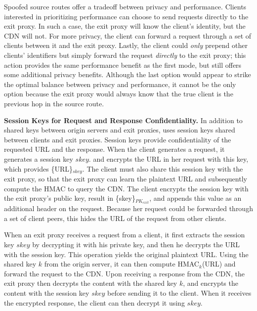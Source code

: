 Spoofed source routes offer a tradeoff between privacy and performance. Clients interested in prioritizing performance can choose to send requests directly to the exit proxy. In such a case, the exit proxy will know the client's identity, but the CDN will not. For more privacy, the client can forward a request through a set of clients between it and the exit proxy. Lastly, the client could {\it only} prepend other clients' identifiers but simply forward the request {\em directly} to the exit proxy; this action provides the same performance benefit as the first mode, but still offers some additional privacy benefits. Although the last option would appear to strike the optimal balance between privacy and performance, it cannot be the only option because the exit proxy would always know that the true client is the previous hop in the source route. %


\textbf{Session Keys for Request and Response Confidentiality.}
In addition to shared keys between origin servers and exit proxies, \system{} uses session keys shared 
between clients and exit proxies.  Session keys provide confidentiality of the requested URL and the 
response.  When the client generates a request, it generates a session key $skey$.
and encrypts 
the URL in her request with this key, which provides \{URL\}$_{skey}$.  The client
must also share this session key
with the exit proxy, so that the exit proxy can learn the plaintext URL and subsequently compute the HMAC to 
query the CDN.  The client encrypts the session key with the exit proxy's public key, result in \{skey\}$_{PK_{exit}}$, 
and appends this value as an additional header on the request.  Because her request
could be forwarded through 
a set of client peers, this hides the URL of the request from other clients.

When an exit proxy receives a request from a client, it first extracts the session
key $skey$ by decrypting it with 
his private key, and then he decrypts the URL with the session key.  This operation
yields the original plaintext
URL. Using the shared key $k$ from the origin server, it can then compute
HMAC$_k$(URL) and forward the request 
to the CDN.  Upon receiving a response from the CDN, the exit proxy then decrypts
the content with the shared key $k$, and
encrypts the content with the session key $skey$ before sending it to the client.
When it receives the encrypted response, 
the client can then decrypt it using $skey$.

